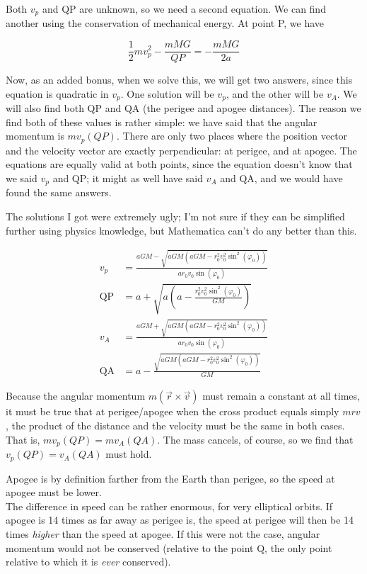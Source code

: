 \documentclass[8.01x]{subfiles}
\begin{document}
Both $v_p$ and QP are unknown, so we need a second equation. We can find another using the conservation of mechanical energy. At point P, we have

\begin{equation}
\frac{1}{2} m v_p^2 - \frac{m M G}{QP} = - \frac{m M G}{2a}
\end{equation}

Now, as an added bonus, when we solve this, we will get two answers, since this equation is quadratic in $v_p$. One solution will be $v_p$, and the other will be $v_A$. We will also find both QP and QA (the perigee and apogee distances). The reason we find both of these values is rather simple: we have said that the angular momentum is $m v_p (QP)$. There are only two places where the position vector and the velocity vector are exactly perpendicular: at perigee, and at apogee. The equations are equally valid at both points, since the equation doesn't know that we said $v_p$ and QP; it might as well have said $v_A$ and QA, and we would have found the same answers.

The solutions I got were extremely ugly; I'm not sure if they can be simplified further using physics knowledge, but Mathematica can't do any better than this.

\begin{align}
v_p        &= \frac{a G M - \sqrt{a G M \left(a G M- r_0^2 v_0^2 \sin^2 (\varphi_0)\right)}}{a r_0 v_0 \sin (\varphi_0) }\\
\text{QP}  &= a + \sqrt{a\left(a - \frac{r_0^2 v_0^2 \sin^2(\varphi_0)}{G M}\right)}\\
v_A        &= \frac{a G M + \sqrt{a G M \left(a G M- r_0^2 v_0^2 \sin^2 (\varphi_0)\right)}}{a r_0 v_0 \sin (\varphi_0)}\\
\text{QA}  &= a - \frac{\sqrt{a G M(a G M - r_0^2 v_0^2 \sin^2(\varphi_0))}}{G M}
\end{align}

Because the angular momentum $m(\vec{r} \times \vec{v})$ must remain a constant at all times, it must be true that at perigee/apogee when the cross product equals simply $m r v$, the product of the distance and the velocity must be the same in both cases. That is, $m v_p (QP) = m v_A (QA)$. The mass cancels, of course, so we find that $v_p (QP) = v_A (QA)$ must hold.

Apogee is by definition farther from the Earth than perigee, so the speed at apogee must be lower.\\
The difference in speed can be rather enormous, for very elliptical orbits. If apogee is 14 times as far away as perigee is, the speed at perigee will then be 14 times \emph{higher} than the speed at apogee. If this were not the case, angular momentum would not be conserved (relative to the point Q, the only point relative to which it is \emph{ever} conserved).
\end{document}
